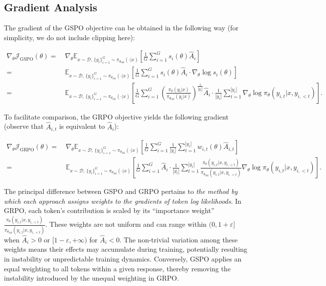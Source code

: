 \subsection{Gradient Analysis}
\label{subsec:gradient}

The gradient of the GSPO objective can be obtained in the following way (for simplicity, we do not include clipping here):

\begin{align}
\nabla_{\theta} \mathcal{J}_\text{GSPO} (\theta)
=&\ 
\nabla_{\theta} \mathbb{E}_{ x \sim \mathcal{D},\, \{y_i\}_{i=1}^G \sim \pi_{\theta_\text{old}}( \cdot | x) }
\left[ 
\frac{1}{G} \sum_{i=1}^{G} s_{i}(\theta) \widehat{A}_{i}
\right] \\
= &\ 
\mathbb{E}_{ x \sim \mathcal{D},\, \{y_i\}_{i=1}^G \sim \pi_{\theta_\text{old}}( \cdot | x) }
\left[ 
\frac{1}{G} \sum_{i=1}^{G}
s_{i}(\theta) \widehat{A}_{i}
\cdot \nabla_{\theta} \log s_{i}(\theta)
\right] \\
=&\ 
\mathbb{E}_{ x \sim \mathcal{D},\, \{y_i\}_{i=1}^G \sim \pi_{\theta_\text{old}}( \cdot | x) }
\left[ 
\frac{1}{G} \sum_{i=1}^{G} 
\left( \frac{ \pi_{\theta} (y_i | x) }{ \pi_{\theta_\text{old}} (y_i | x)} \right)^{\frac{1}{|y_i|}} \widehat{A}_{i} 
\cdot \frac{1}{|y_i|} \sum_{t=1}^{|y_i|} \nabla_{\theta} \log \pi_{\theta} (y_{i,t} | x, y_{i,<t}) 
\right].
\label{equ:gspo_grad}
\end{align}

To facilitate comparison, the GRPO objective yields the following gradient (observe that $\widehat{A}_{i,t}$ is equivalent to $\widehat{A}_{i}$):

\begin{align}
\nabla_{\theta} \mathcal{J}_\text{GRPO} (\theta) 
=&\ 
\nabla_{\theta} \mathbb{E}_{ x \sim \mathcal{D},\, \{y_i\}_{i=1}^G \sim \pi_{\theta_\text{old}}( \cdot | x) }
\left[ \frac{1}{G} \sum_{i=1}^{G} \frac{1}{|y_i|} \sum_{t=1}^{|y_i|} 
w_{i,t}(\theta) \widehat{A}_{i,t}
\right] \\
=&\
\mathbb{E}_{ x \sim \mathcal{D},\, \{y_i\}_{i=1}^G \sim \pi_{\theta_\text{old}}( \cdot | x) }
\left[ \frac{1}{G} \sum_{i=1}^{G} \widehat{A}_{i} 
\cdot \frac{1}{|y_i|} \sum_{t=1}^{|y_i|} 
\frac{ \pi_{\theta} (y_{i,t} | x, y_{i,<t}) }{ \pi_{\theta_\text{old}} (y_{i,t} | x,y_{i,<t})} 
\nabla_{\theta} \log \pi_{\theta} (y_{i,t} | x, y_{i,<t})  
\right].
\end{align}

The principal difference between GSPO and GRPO pertains to \textit{the method by which each approach assigns weights to the gradients of token log likelihoods}. In GRPO, each token's contribution is scaled by its ``importance weight'' $\frac{ \pi_{\theta} (y_{i,t} | x, y_{i,<t}) }{ \pi_{\theta_\text{old}} (y_{i,t} | x,y_{i,<t})}$. These weights are not uniform and can range within $(0, 1+\varepsilon]$ when $\widehat{A}_{i} > 0$ or $[1-\varepsilon, +\infty)$ for $\widehat{A}_{i} < 0$. The non-trivial variation among these weights means their effects may accumulate during training, potentially resulting in instability or unpredictable training dynamics. Conversely, GSPO applies an equal weighting to all tokens within a given response, thereby removing the instability introduced by the unequal weighting in GRPO.

